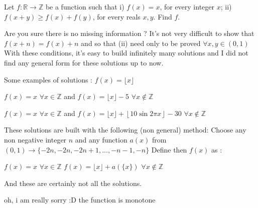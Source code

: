 \begin{solution}
	\begin{tcolorbox}Let $f:\mathbb{R} \rightarrow \mathbb{Z}$ be a function such that
i) $f(x)=x$, for every integer $x$;
ii) $f(x+y) \ge f(x)+f(y)$, for every reals $x,y$.
Find $f$.\end{tcolorbox}
Are you sure there is no missing information ?
It's not very difficult to show that $f(x+n)=f(x)+n$ and so that (ii) need only to be proved $\forall x,y\in(0,1)$
With these conditions, it's easy to build infinitely many solutions and I did not find any general form for these solutions up to now.


Some examples of solutions :
$f(x)=\lfloor x\rfloor$

$f(x)=x$ $\forall x\in\mathbb Z$ and $f(x)=\lfloor x\rfloor-5$ $\forall x\notin\mathbb Z$

$f(x)=x$ $\forall x\in\mathbb Z$ and $f(x)=\lfloor x\rfloor+\left\lfloor 10\sin 2\pi x\right\rfloor-30$ $\forall x\notin\mathbb Z$

These solutions are built with the following (non general)  method:
Choose any non negative integer $n$ and any function $a(x)$ from $(0,1)\to\{-2n,-2n,-2n+1,...,-n-1,-n\}$
Define then $f(x)$ as :

$f(x)=x$ $\forall x\in\mathbb Z$
$f(x)=\lfloor x\rfloor+a(\{x\})$ $\forall x\notin\mathbb Z$

And these are certainly not all the solutions.
\end{solution}



\begin{solution}
	oh, i am really sorry :D the function is monotone
\end{solution}



